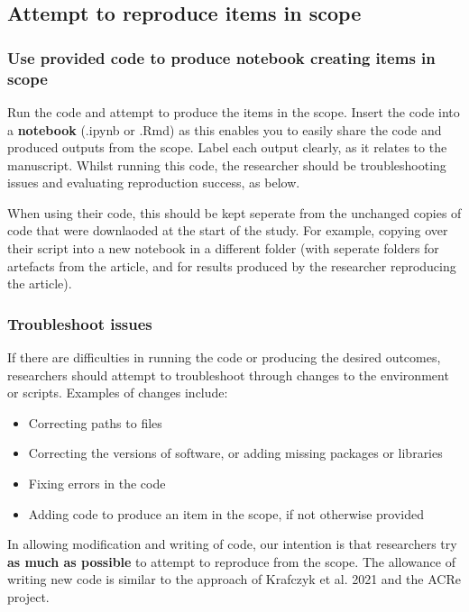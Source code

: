 \subsection{Attempt to reproduce items in scope}

\subsubsection{Use provided code to produce notebook creating items in scope}

Run the code and attempt to produce the items in the scope. Insert the code into a \textbf{notebook} (.ipynb or .Rmd) as this enables you to easily share the code and produced outputs from the scope. Label each output clearly, as it relates to the manuscript. Whilst running this code, the researcher should be troubleshooting issues and evaluating reproduction success, as below.

When using their code, this should be kept seperate from the unchanged copies of code that were downlaoded at the start of the study. For example, copying over their script into a new notebook in a different folder (with seperate folders for artefacts from the article, and for results produced by the researcher reproducing the article).

\subsubsection{Troubleshoot issues}

If there are difficulties in running the code or producing the desired outcomes, researchers should attempt to troubleshoot through changes to the environment or scripts. Examples of changes include:
\begin{itemize}
    \item Correcting paths to files
    \item Correcting the versions of software, or adding missing packages or libraries
    \item Fixing errors in the code
    \item Adding code to produce an item in the scope, if not otherwise provided
\end{itemize}

In allowing modification and writing of code, our intention is that researchers try \textbf{as much as possible} to attempt to reproduce from the scope. The allowance of writing new code is similar to the approach of Krafczyk et al. 2021\autocite{krafczyk_learning_2021} and the ACRe project\autocite{berkeley_initiative_for_transparency_in_the_social_sciences_guide_2022}.

